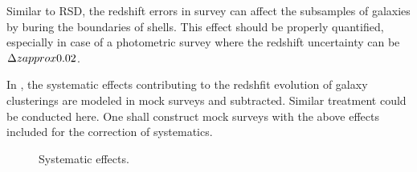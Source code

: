 \documentclass[iop]{emulateapj}
\begin{document}
Similar to RSD, the redshift errors in survey can affect the subsamples of galaxies by buring the boundaries of shells.
This effect should be properly quantified, especially in case of a photometric survey where the redshift uncertainty can be $\Delta z \\approx 0.02$.

In \cite{Li2014,Li2015,Li2016}, the systematic effects contributing to the redshfit evolution of galaxy clusterings 
are modeled in mock surveys and subtracted.
Similar treatment could be conducted here.
One shall construct mock surveys with the above effects included for the correction of systematics.






\begin{figure}
   \caption{\label{fig_sys}
  Systematic effects.
   }
\end{figure}
\end{document}
